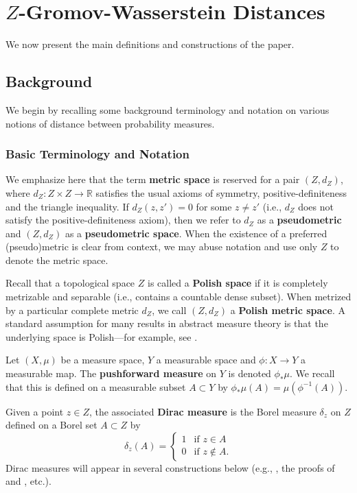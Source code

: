 \documentclass[twoside,11pt]{article}
\theoremstyle{definition}
\newcommand{\R}{\mathbb{R}}
\newcommand{\define}[1]{\textbf{#1}}
\begin{document}
\section{\texorpdfstring{$Z$}{Z}-Gromov-Wasserstein Distances}\label{sec:basic_definitions}

We now present the main definitions and constructions of the paper.

\subsection{Background}

We begin by recalling some background terminology and notation on various notions of distance between probability measures. 

\subsubsection{Basic Terminology and Notation}\label{sec:basic_terminology}

We emphasize here that the term \define{metric space} is reserved for a pair $(Z,d_Z)$, where $d_Z:Z \times Z \to \R$ satisfies the usual axioms of symmetry, positive-definiteness and the triangle inequality. If $d_Z(z,z') = 0$ for some $z \neq z'$ (i.e., $d_Z$ does not satisfy the positive-definiteness axiom), then we refer to $d_Z$ as a \define{pseudometric} and $(Z,d_Z)$ as a \define{pseudometric space}. When the existence of a preferred (pseudo)metric is clear from context, we may abuse notation and use only $Z$ to denote the metric space. 

Recall that a topological space $Z$ is called a \define{Polish space} if it is completely metrizable and separable (i.e., contains a countable dense subset). When metrized by a particular complete metric $d_Z$, we call $(Z,d_Z)$ a \define{Polish metric space}. A standard assumption for many results in abstract measure theory is that the underlying space is Polish---for example, see \citep{srivastava2008course}.

Let $(X,\mu)$ be a measure space, $Y$ a measurable space and $\phi:X \to Y$ a measurable map. The \define{pushforward measure} on $Y$ is denoted $\phi_\ast \mu$. We recall that this is defined on a measurable subset $A \subset Y$ by $\phi_\ast \mu(A) = \mu(\phi^{-1}(A))$. 

Given a point $z \in Z$, the associated \define{Dirac measure} is the Borel measure $\delta_z$ on $Z$ defined on a Borel set $A \subset Z$ by  
\[
\delta_z(A) = \left\{\begin{array}{lr}
1 & \mbox{if $z \in A$}\\
0 & \mbox{if $z \not \in A$.}
\end{array}\right.
\]
Dirac measures will appear in several constructions below (e.g., , the proofs of  and , etc.).
\end{document}
